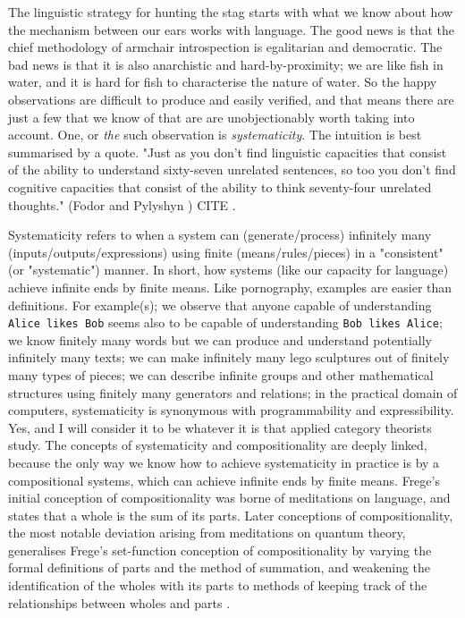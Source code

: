  The linguistic strategy for hunting the stag starts with what we know about how the mechanism between our ears works with language. The good news is that the chief methodology of armchair introspection is egalitarian and democratic. The bad news is that it is also anarchistic and hard-by-proximity; we are like fish in water, and it is hard for fish to characterise the nature of water. So the happy observations are difficult to produce and easily verified, and that means there are just a few that we know of that are are unobjectionably worth taking into account. One, or \emph{the} such observation is \emph{systematicity}. The intuition is best summarised by a quote. "Just as you don't find linguistic capacities that consist of the ability to understand sixty-seven unrelated sentences, so too you don't find cognitive capacities that consist of the ability to think seventy-four unrelated thoughts." (Fodor and Pylyshyn \citep{fodor_connectionism_1988}) \bR CITE \e.

 Systematicity refers to when a system can (generate/process) infinitely many (inputs/outputs/expressions) using finite (means/rules/pieces) in a "consistent" (or "systematic") manner. In short, how systems (like our capacity for language) achieve infinite ends by finite means. Like pornography, examples are easier than definitions. For example(s); we observe that anyone capable of understanding \texttt{Alice likes Bob} seems also to be capable of understanding \texttt{Bob likes Alice}; we know finitely many words but we can produce and understand potentially infinitely many texts; we can make infinitely many lego sculptures out of finitely many types of pieces; we can describe infinite groups and other mathematical structures using finitely many generators and relations; in the practical domain of computers, systematicity is synonymous with programmability and expressibility.\\

 Yes, and I will consider it to be whatever it is that applied category theorists study. The concepts of systematicity and compositionality are deeply linked, because the only way we know how to achieve systematicity in practice is by a compositional systems, which can achieve infinite ends by finite means. Frege's initial conception of compositionality \citep{frege_gottlob_selbst_1884} was borne of meditations on language, and states that a whole is the sum of its parts. Later conceptions of compositionality, the most notable deviation arising from meditations on quantum theory, generalises Frege's set-function conception of compositionality by varying the formal definitions of parts and the method of summation, and weakening the identification of the wholes with its parts to methods of keeping track of the relationships between wholes and parts \citep{coecke_compositionality_2021}.

